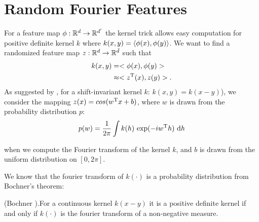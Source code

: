 \documentclass[twoside]{memoir}
\begin{document}
\section{Random Fourier Features} \label{sec:RFFs}
For a feature map $\phi: \mathbb{R}^d \rightarrow \mathbb{R}^{d'}$ the kernel trick allows easy computation for positive definite kernel $k$ where $k(x,y) = \langle\phi(x),\phi(y)\rangle$. We want to find a randomized feature map $z: \mathbb{R}^d \rightarrow \mathbb{R}^{\bar{d}}$ such that 
\begin{equation*}
\begin{split}
k(x,y) &= <\phi(x), \phi(y)> \\
&\approx <z^{\text{T}}(x), z(y)>.
\end{split}
\end{equation*}
As suggested by \cite{RFF_Rahimi}, for a shift-invariant kernel $k$: $k(x, y) = k(x - y)$), we consider the mapping $z(x) = cos(w^{\text{T}}x + b)$, where $w$ is drawn from the probability distribution $p$:
\begin{equation}
p(w) = \frac{1}{2\pi} \int k(h) ~ \text{exp}(-iw^{\text{T}}h) ~ \text{d}h
\label{eq:probFourier}
\end{equation} 

when we compute the Fourier transform of the kernel $k$, and $b$ is drawn from the uniform distribution on $[0, 2\pi]$.

We know that the fourier transform of $k(\cdot)$ is a probability distribution from Bochner's theorem:
\begin{thm} \label{thm:Bochner}
	(Bochner \cite{Rudin_1990}).For a continuous kernel $k(x - y)$  it is a positive definite kernel if and only if $k(\cdot)$ is the fourier transform of a non-negative measure.
\end{thm}
\end{document}
